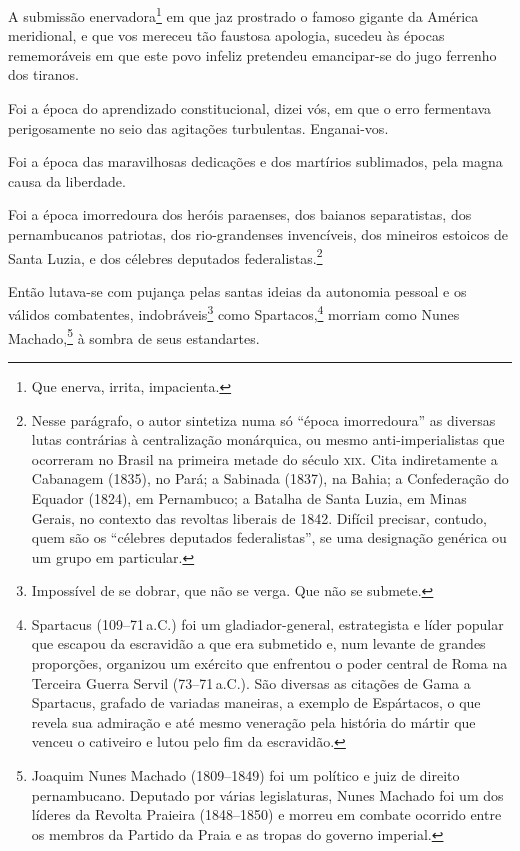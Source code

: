 A submissão enervadora\footnote{Que enerva, irrita, impacienta.} em
que jaz prostrado o famoso gigante da América meridional, e que vos
mereceu tão faustosa apologia, sucedeu às épocas rememoráveis em que
este povo infeliz pretendeu emancipar-se do jugo ferrenho dos tiranos.

Foi a época do aprendizado constitucional, dizei vós, em que o erro
fermentava perigosamente no seio das agitações turbulentas. Enganai-vos.

Foi a época das maravilhosas dedicações e dos martírios sublimados, pela
magna causa da liberdade.

Foi a época imorredoura dos heróis paraenses, dos baianos separatistas,
dos pernambucanos patriotas, dos rio-grandenses invencíveis, dos
mineiros estoicos de Santa Luzia, e dos célebres deputados
federalistas.\footnote{Nesse parágrafo, o autor sintetiza numa só
  ``época imorredoura'' as diversas lutas contrárias à centralização
  monárquica, ou mesmo anti-imperialistas que ocorreram no Brasil na
  primeira metade do século \textsc{xix}. Cita indiretamente a Cabanagem (1835),
  no Pará; a Sabinada (1837), na Bahia; a Confederação do Equador
  (1824), em Pernambuco; a Batalha de Santa Luzia, em Minas Gerais, no
  contexto das revoltas liberais de 1842. Difícil precisar, contudo,
  quem são os ``célebres deputados federalistas'', se uma designação
  genérica ou um grupo em particular.}

Então lutava-se com pujança pelas santas ideias da autonomia pessoal e
os válidos combatentes, indobráveis\footnote{Impossível de se dobrar,
  que não se verga. Que não se submete.} como Spartacos,\footnote{ \label{spartacus}
  Spartacus (109--71\,a.C.) foi um gladiador-general, estrategista e
  líder popular que escapou da escravidão a que era submetido e, num
  levante de grandes proporções, organizou um exército que enfrentou o
  poder central de Roma na Terceira Guerra Servil (73--71\,a.C.). São
  diversas as citações de Gama a Spartacus, grafado de variadas
  maneiras, a exemplo de Espártacos, o que revela sua admiração e até
  mesmo veneração pela história do mártir que venceu o cativeiro e lutou
  pelo fim da escravidão.} morriam como Nunes Machado,\footnote{
  Joaquim Nunes Machado (1809--1849) foi um político e juiz de direito
  pernambucano. Deputado por várias legislaturas, Nunes Machado foi um dos
  líderes da Revolta Praieira (1848--1850) e morreu em combate ocorrido
  entre os membros da Partido da Praia e as tropas do governo imperial.}
à sombra de seus estandartes.

